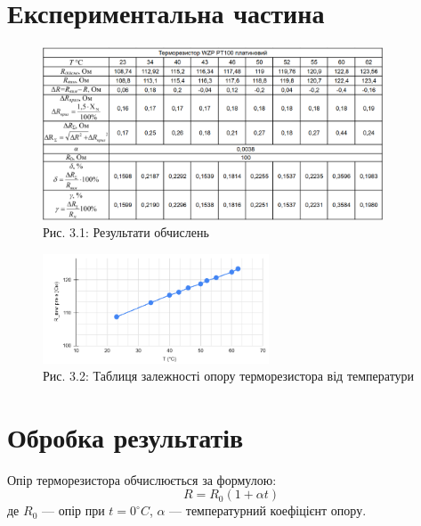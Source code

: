 \documentclass[a4paper]{article}
\begin{document}
\newpage 



\section*{Експериментальна частина}

\begin{figure}[h]
    \centering
\includegraphics[width=0.9\textwidth]{imgs/LW3.1.png}
    \caption*{Рис. 3.1: Результати обчислень}
\end{figure} 

\begin{figure}[h]
    \centering
\includegraphics[width=0.6\textwidth]{imgs/LW3.3.png}
    \caption*{Рис. 3.2: Таблиця залежності опору терморезистора від температури}
\end{figure} 



\section*{Обробка результатів}
Опір терморезистора обчислюється за формулою:
\begin{equation}
    R = R_0 (1 + \alpha t)
\end{equation}
де $R_0$ — опір при $t = 0^{\circ}C$, $\alpha$ — температурний коефіцієнт опору.
\end{document}
